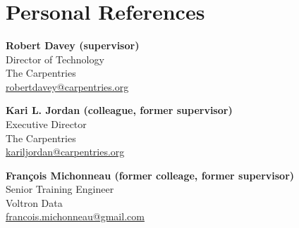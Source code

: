 \documentclass[10pt,letterpaper,sans]{modernresume} %
\title{ } %
\begin{document}
% 

\makecvtitle %



\vspace{5pt}

\section{Personal References}

\vspace{5pt}

\textbf{Robert Davey (supervisor)}\\
Director of Technology\\
The Carpentries\\
\href{mailto:robertdavey@carpentries.org?subject=Reference for Zhian N. Kamvar}{robertdavey@carpentries.org}

\bigskip

\textbf{Kari L. Jordan (colleague, former supervisor)}\\
Executive Director\\
The Carpentries\\
\href{mailto:kariljordan@carpentries.org?subject=Reference for Zhian N. Kamvar}{kariljordan@carpentries.org}

\bigskip


\textbf{François Michonneau (former colleage, former supervisor)}\\
Senior Training Engineer\\
Voltron Data\\
\href{mailto:francois.michonneau@gmail.com?subject=Reference for Zhian N. Kamvar}{francois.michonneau@gmail.com}



\end{document}
